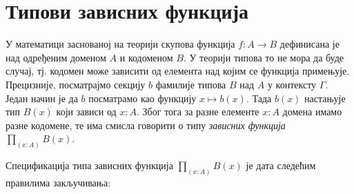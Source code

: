 \documentclass[12pt,oneside]{memoir}
\begin{document}
\section{Типови зависних функција}

У математици заснованој на теорији скупова функција $f : A \to B$ дефинисана је над одређеним доменом $A$ и кодоменом $B$. У теорији типова то не мора да буде случај, тј. кодомен може зависити од елемента над којим се функција примењује. Прецизније, посматрајмо секцију $b$ фамилије типова $B$ над $A$ у контексту $\Gamma$. Један начин је да $b$ посматрамо као функцију $x \mapsto b(x)$. Тада $b(x)$ настањује тип $B(x)$ који зависи од $x : A$. Због тога за разне елементе $x : A$ домена имамо разне кодомене, те има смисла говорити о типу \emph{зависних функција} $\prod_{(x : A)} B(x)$. 

Спецификација типа зависних функција $\prod_{(x:A)} B(x)$ је дата следећим правилима закључивања:
\end{document}
